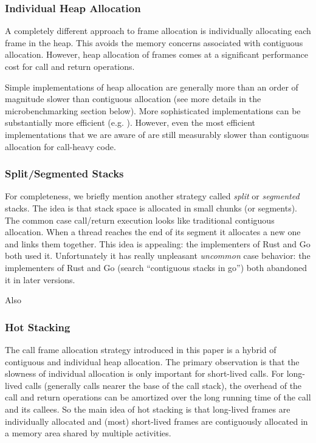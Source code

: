 \documentclass[10pt,preprint]{sigplanconf}
\begin{document}
\subsubsection{Individual Heap Allocation}

A completely different approach to frame allocation is individually allocating each frame in the heap.
This avoids the memory concerns associated with contiguous allocation.
However, heap allocation of frames comes at a significant performance cost for call and return operations.

Simple implementations of heap allocation are generally more than an order of magnitude slower than contiguous allocation (see more details in the microbenchmarking section below).
More sophisticated implementations can be substantially more efficient (e.g. \cite{Shao2000}).
However, even the most efficient implementations that we are aware of are still measurably slower than contiguous allocation for call-heavy code.

\subsubsection{Split/Segmented Stacks}

For completeness, we briefly mention another strategy called \emph{split} or \emph{segmented} stacks.
The idea is that stack space is allocated in small chunks (or segments).
The common case call/return execution looks like traditional contiguous allocation.
When a thread reaches the end of its segment it allocates a new one and links them together.
This idea is appealing: the implementers of Rust and Go both used it.
Unfortunately it has really unpleasant \emph{uncommon} case behavior: the implementers of Rust \cite{Anderson2013} and Go (search ``contiguous stacks in go'') both abandoned it in later versions.

Also \cite{Middha2008}

\subsubsection{Hot Stacking}

The call frame allocation strategy introduced in this paper is a hybrid of contiguous and individual heap allocation.
The primary observation is that the slowness of individual allocation is only important for short-lived calls.
For long-lived calls (generally calls nearer the base of the call stack), the overhead of the call and return operations can be amortized over the long running time of the call and its callees.
So the main idea of hot stacking is that long-lived frames are individually allocated and (most) short-lived frames are contiguously allocated in a memory area shared by multiple activities.
\end{document}
